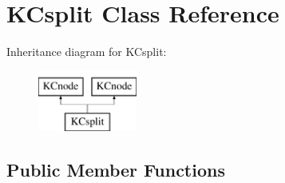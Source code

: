 \hypertarget{class_k_csplit}{
\section{KCsplit Class Reference}
\label{class_k_csplit}
}
Inheritance diagram for KCsplit:\begin{figure}[H]
\begin{center}
\leavevmode
\includegraphics[height=2cm]{class_k_csplit}
\end{center}
\end{figure}
\subsection*{Public Member Functions}
